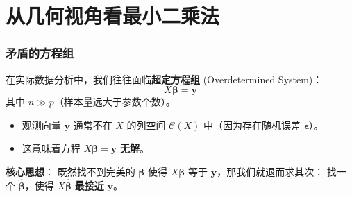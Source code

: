 
\section[几何视角]{从几何视角看最小二乘法}


\begin{frame}
\frametitle{矛盾的方程组}

在实际数据分析中，我们往往面临\textbf{超定方程组} (Overdetermined System)：
\[
X \boldsymbol{\beta} = \mathbf{y}
\]
其中 $n \gg p$（样本量远大于参数个数）。

\begin{itemize}
    \item 观测向量 $\mathbf{y}$ 通常不在 $X$ 的列空间 $\mathcal{C}(X)$ 中（因为存在随机误差 $\boldsymbol{\epsilon}$）。
    \item 这意味着方程 $X \boldsymbol{\beta} = \mathbf{y}$ \textbf{无解}。
\end{itemize}

\vspace{1em}
\textbf{核心思想}：
既然找不到完美的 $\boldsymbol{\beta}$ 使得 $X \boldsymbol{\beta}$ 等于 $\mathbf{y}$，那我们就退而求其次：
找一个 $\hat{\boldsymbol{\beta}}$，使得 $X \hat{\boldsymbol{\beta}}$ \textbf{最接近} $\mathbf{y}$。

\end{frame}


